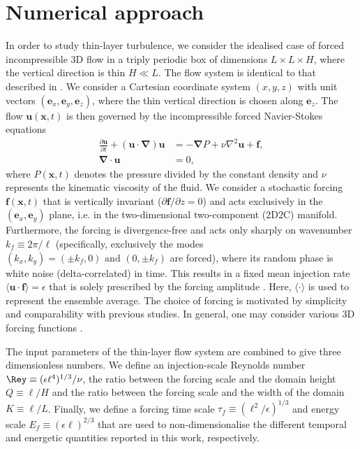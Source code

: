 \documentclass[]{jfm}
\begin{document}
\section{Numerical approach}\label{sec:numerical_approach}  %
In order to study thin-layer turbulence, we consider the idealised case of forced incompressible 3D flow in a triply periodic box of dimensions $L \times L \times H$, where the vertical direction is thin $H\ll L$. The flow system is identical to that described in \citet{VanKan2019}. We consider a Cartesian coordinate system $(x,y,z)$ with unit vectors $(\boldsymbol{e}_x,\boldsymbol{e}_y,\boldsymbol{e}_z)$, where the thin vertical direction is chosen along $\boldsymbol{e}_z$. The flow $\boldsymbol{u}(\boldsymbol{x},t)$ is then governed by the incompressible forced Navier-Stokes equations
\begin{subequations}\begin{align}
    \frac{\partial\boldsymbol{u}}{\partial t}+(\boldsymbol{u}\cdot\boldsymbol{\nabla})\boldsymbol{u}&=-\boldsymbol{\nabla} P+\nu\nabla^2\boldsymbol{u}+\boldsymbol{f},\label{eq:gov1}\\
    \boldsymbol{\nabla}\cdot\boldsymbol{u}&=0,\label{eq:gov2}
\end{align}\end{subequations}
where $P(\boldsymbol{x},t)$ denotes the pressure divided by the constant density and $\nu$ represents the kinematic viscosity of the fluid. We consider a stochastic forcing $\boldsymbol{f}(\boldsymbol{x},t)$ that is vertically invariant ($\partial\boldsymbol{f}/\partial z=0$) and acts exclusively in the $(\boldsymbol{e}_x,\boldsymbol{e}_y)$ plane, i.e. in the two-dimensional two-component (2D2C) manifold. Furthermore, the forcing is divergence-free and acts only sharply on wavenumber $k_f\equiv2\pi/\ell$ (specifically, exclusively the modes $(k_x,k_y)=(\pm k_f,0) \textrm{ and } (0,\pm k_f)$ are forced), where its random phase is white noise (delta-correlated) in time. This results in a fixed mean injection rate $\langle \boldsymbol{u} \cdot \boldsymbol{f} \rangle = \epsilon$ that is solely prescribed by the forcing amplitude \citep{Novikov1965}. Here, $\langle \cdot \rangle$ is used to represent the ensemble average. The choice of forcing is motivated by simplicity and comparability with previous studies. In general, one may consider various 3D forcing functions \citep{Poujol2020}.

The input parameters of the thin-layer flow system are combined to give three dimensionless numbers. We define an injection-scale Reynolds number $\Rey\equiv(\epsilon \ell^4)^{1/3}/\nu$, the ratio between the forcing scale and the domain height $Q\equiv \ell/H$ and the ratio between the forcing scale and the width of the domain $K\equiv \ell/L$. Finally, we define a forcing time scale $\tau_f\equiv(\ell^2/\epsilon)^{1/3}$ and energy scale $E_f\equiv(\epsilon\ell)^{2/3}$ that are used to non-dimensionalise the different temporal and energetic quantities reported in this work, respectively.
\end{document}
